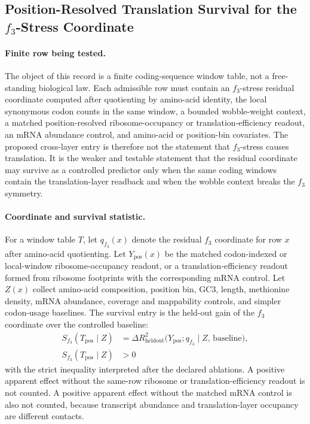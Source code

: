 \subsection{Position-Resolved Translation Survival for the $f_3$-Stress Coordinate}
\label{sec:q6-f3-stress-position-resolved-translation-survival-cross-layer}

\paragraph{Finite row being tested.}
The object of this record is a finite coding-sequence window table, not a free-standing biological law.  Each admissible row must contain an $f_3$-stress residual coordinate computed after quotienting by amino-acid identity, the local synonymous codon counts in the same window, a bounded wobble-weight context, a matched position-resolved ribosome-occupancy or translation-efficiency readout, an mRNA abundance control, and amino-acid or position-bin covariates.  The proposed cross-layer entry is therefore not the statement that $f_3$-stress causes translation.  It is the weaker and testable statement that the residual coordinate may survive as a controlled predictor only when the same coding windows contain the translation-layer readback and when the wobble context breaks the $f_3$ symmetry.

\paragraph{Coordinate and survival statistic.}
For a window table $T$, let $q_{f_3}(x)$ denote the residual $f_3$ coordinate for row $x$ after amino-acid quotienting.  Let $Y_{\mathrm{pos}}(x)$ be the matched codon-indexed or local-window ribosome-occupancy readout, or a translation-efficiency readout formed from ribosome footprints with the corresponding mRNA control.  Let $Z(x)$ collect amino-acid composition, position bin, $\mathrm{GC3}$, length, methionine density, mRNA abundance, coverage and mappability controls, and simpler codon-usage baselines.  The survival entry is the held-out gain of the $f_3$ coordinate over the controlled baseline:
$$
\begin{aligned}
S_{f_3}(T_{\mathrm{pos}}\mid Z)
  &= \Delta R^2_{\mathrm{heldout}}\bigl(Y_{\mathrm{pos}}; q_{f_3} \mid Z,\, \mathrm{baseline}\bigr),\\
S_{f_3}(T_{\mathrm{pos}}\mid Z) &> 0
\end{aligned}
$$
with the strict inequality interpreted after the declared ablations.  A positive apparent effect without the same-row ribosome or translation-efficiency readout is not counted.  A positive apparent effect without the matched mRNA control is also not counted, because transcript abundance and translation-layer occupancy are different contacts.

